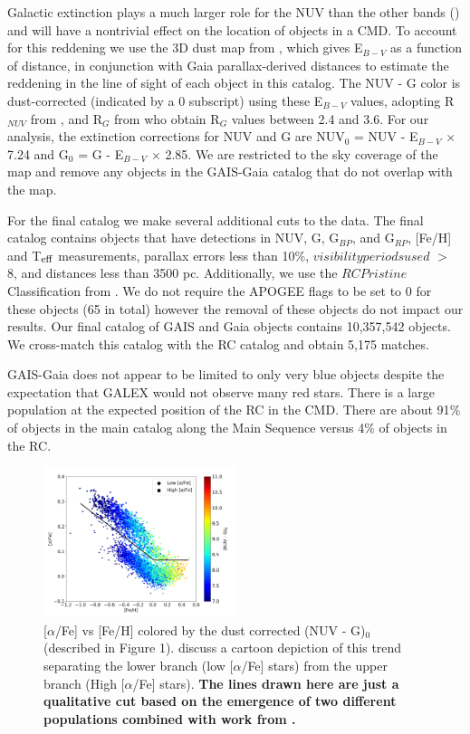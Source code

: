 \documentclass[twocolumn]{emulateapj}
\begin{document}
Galactic extinction plays a much larger role for the NUV than the other bands (\citealt{ccm89}) and will have a nontrivial effect on the location of objects in a CMD. To account for this reddening we use the 3D dust map from \citealt{GSF15}, which gives E$_{B - V}$ as a function of distance, in conjunction with Gaia parallax-derived distances to estimate the reddening in the line of sight of each object in this catalog. The NUV - G color is dust-corrected (indicated by a 0 subscript) using these E$_{B - V}$ values, adopting R$_{NUV}$ from \citealt{yuan13}, and R$_G$ from \citealt{jordi2010} who obtain R$_G$ values between 2.4 and 3.6. For our analysis, the extinction corrections for NUV and G are NUV$_0$ = NUV - E$_{B - V}$ $\times$ 7.24 and G$_0$ = G - E$_{B - V}$ $\times$ 2.85. We are restricted to the sky coverage of the \citealt{GSF15} map and remove any objects in the GAIS-Gaia catalog that do not overlap with the map. 

For the final catalog we make several additional cuts to the data. The final catalog contains objects that have detections in NUV, G, G$_{BP}$, and G$_{RP}$, [Fe/H] and T$_{\rm{eff}}$ measurements, parallax errors less than 10$\%$, $visibility$\textunderscore$periods$\textunderscore$used$ $>$ 8, and distances less than 3500 pc. Additionally, we use the $RC$\textunderscore$Pristine$ Classification from \citealt{ting18}. We do not require the APOGEE flags to be set to 0 for these objects (65 in total) however the removal of these objects do not impact our results. Our final catalog of GAIS and Gaia objects contains 10,357,542 objects. We cross-match this catalog with the RC catalog and obtain 5,175 matches. 

GAIS-Gaia does not appear to be limited to only very blue objects despite the expectation that GALEX would not observe many red stars. There is a large population at the expected position of the RC in the CMD. There are about 91$\%$ of objects in the main catalog along the Main Sequence versus 4$\%$ of objects in the RC. 

\begin{figure}[] %
\centering
\includegraphics[width=0.5\textwidth]{f5.pdf}
\caption{[$\alpha$/Fe] vs [Fe/H] colored by the dust corrected (NUV - G)$_0$ (described in Figure 1). \citealt{hawkins15} discuss a cartoon depiction of this trend separating the lower branch (low [$\alpha$/Fe] stars) from the upper branch (High [$\alpha$/Fe] stars). \textbf{The lines drawn here are just a qualitative cut based on the emergence of two different populations combined with work from \citealt{hawkins15}.}}
\end{figure}
\end{document}
